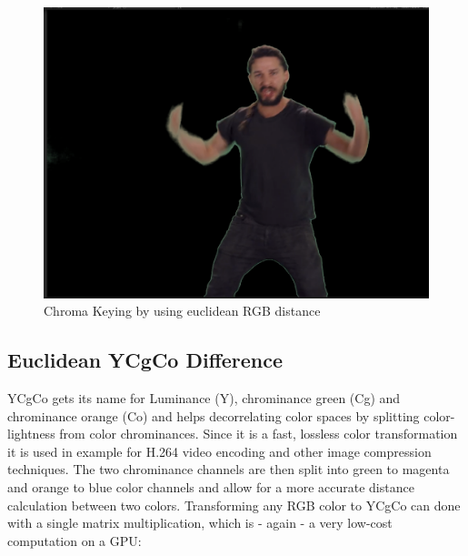 \begin{figure}[htb]
	\includegraphics[width=\textwidth]{_raw_resources/Comparison_RGB_color.png}
	\caption{Chroma Keying by using euclidean RGB distance}
	\label{fig:chroma:euclidean:rgb}
\end{figure}

\subsection{Euclidean YCgCo Difference}

YCgCo gets its name for Luminance (Y), chrominance green (Cg) and chrominance 
orange (Co) and helps decorrelating color spaces by splitting color-lightness 
from color chrominances. Since it is a fast, lossless color transformation it 
is used in example for H.264 video encoding and other image compression 
techniques. The two chrominance channels are then split into green to magenta 
and orange to blue color channels and allow for a more accurate distance 
calculation between two colors.
\newline
Transforming any RGB color to YCgCo can done with a single matrix  
multiplication, which is - again - a very low-cost computation on a GPU:


